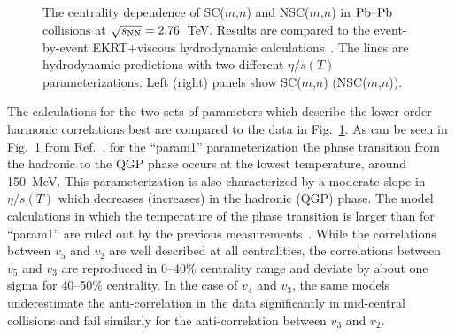 \begin{figure}[t!]
            \begin{center}
              \end{center}
        \caption{The centrality dependence of SC($m$,$n$) and NSC($m$,$n$) in $\textnormal{Pb--Pb}$ collisions at $\sqrt{s_{\textnormal{NN}}}=2.76$~TeV. Results are compared to the event-by-event EKRT+viscous hydrodynamic calculations~\cite{Niemi:2015qia}. The lines are hydrodynamic predictions with two different $\eta/s(T)$ parameterizations. Left (right) panels show SC($m$,$n$) (NSC($m$,$n$)).}        
        \label{fig:Figure_4}
\end{figure}

The calculations for the two sets of parameters which describe the lower order harmonic correlations best are compared to the data in Fig.~\ref{fig:Figure_4}. 
As can be seen in Fig.~1 from Ref.~\cite{Niemi:2015qia}, for the ``param1'' parameterization the phase transition from the hadronic to the QGP phase occurs at the lowest temperature, around 150~MeV. This parameterization is also characterized by a moderate slope in $\eta/s(T)$ which decreases (increases) in the hadronic (QGP) phase.
The model calculations in which the temperature of the phase transition is larger than for ``param1'' are ruled out by the previous measurements~\cite{ALICE:2016kpq}.
While the correlations between $v_5$ and $v_2$ are well described at all centralities, the correlations between $v_5$ and $v_3$ are reproduced in 0--40\% centrality range and deviate by about one sigma for 40--50\% centrality.
In the case of $v_4$ and $v_3$, the same models underestimate the anti-correlation in the data significantly in mid-central collisions and fail similarly for the anti-correlation between $v_3$ and $v_2$.

